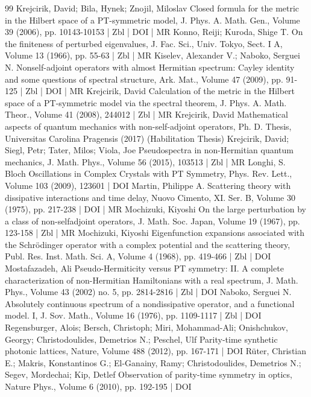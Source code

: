 \begin{thebibliography}{99}
Krejcirik, David; Bila, Hynek; Znojil, Miloslav Closed formula for the metric in the Hilbert space of a PT-symmetric model, J. Phys. A. Math. Gen., Volume 39 (2006), pp. 10143-10153 | Zbl | DOI | MR
Konno, Reiji; Kuroda, Shige T. On the finiteness of perturbed eigenvalues, J. Fac. Sci., Univ. Tokyo, Sect. I A, Volume 13 (1966), pp. 55-63 | Zbl | MR
Kiselev, Alexander V.; Naboko, Serguei N. Nonself-adjoint operators with almost Hermitian spectrum: Cayley identity and some questions of spectral structure, Ark. Mat., Volume 47 (2009), pp. 91-125 | Zbl | DOI | MR
Krejcirik, David Calculation of the metric in the Hilbert space of a PT-symmetric model via the spectral theorem, J. Phys. A. Math. Theor., Volume 41 (2008), 244012 | Zbl | MR
Krejcirik, David Mathematical aspects of quantum mechanics with non-self-adjoint operators, Ph. D. Thesis, Universitas Carolina Pragensis (2017) (Habilitation Thesis)
Krejcirik, David; Siegl, Petr; Tater, Milos; Viola, Joe Pseudospectra in non-Hermitian quantum mechanics, J. Math. Phys., Volume 56 (2015), 103513 | Zbl | MR
Longhi, S. Bloch Oscillations in Complex Crystals with PT Symmetry, Phys. Rev. Lett., Volume 103 (2009), 123601 | DOI
Martin, Philippe A. Scattering theory with dissipative interactions and time delay, Nuovo Cimento, XI. Ser. B, Volume 30 (1975), pp. 217-238 | DOI | MR
Mochizuki, Kiyoshi On the large perturbation by a class of non-selfadjoint operators, J. Math. Soc. Japan, Volume 19 (1967), pp. 123-158 | Zbl | MR
Mochizuki, Kiyoshi Eigenfunction expansions associated with the Schrödinger operator with a complex potential and the scattering theory, Publ. Res. Inst. Math. Sci. A, Volume 4 (1968), pp. 419-466 | Zbl | DOI
Mostafazadeh, Ali Pseudo-Hermiticity versus PT symmetry: II. A complete characterization of non-Hermitian Hamiltonians with a real spectrum, J. Math. Phys., Volume 43 (2002) no. 5, pp. 2814-2816 | Zbl | DOI
Naboko, Serguei N. Absolutely continuous spectrum of a nondissipative operator, and a functional model. I, J. Sov. Math., Volume 16 (1976), pp. 1109-1117 | Zbl | DOI
Regensburger, Alois; Bersch, Christoph; Miri, Mohammad-Ali; Onishchukov, Georgy; Christodoulides, Demetrios N.; Peschel, Ulf Parity-time synthetic photonic lattices, Nature, Volume 488 (2012), pp. 167-171 | DOI
Rüter, Christian E.; Makris, Konstantinos G.; El-Ganainy, Ramy; Christodoulides, Demetrios N.; Segev, Mordechai; Kip, Detlef Observation of parity-time symmetry in optics, Nature Phys., Volume 6 (2010), pp. 192-195 | DOI

\end{thebibliography}
